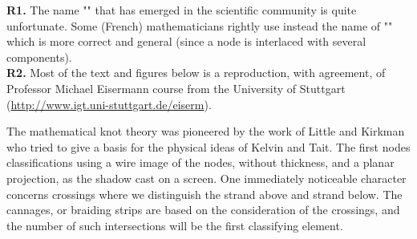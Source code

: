 {	\begin{tcolorbox}[title=Remarks,colframe=black,arc=10pt]
	\textbf{R1.} The name "" that has emerged in the scientific community is quite unfortunate. Some (French)  mathematicians rightly use instead the name of "" which is more correct and general (since a node is interlaced with several components).\\
	
	\textbf{R2.} Most of the text and figures below is a reproduction, with agreement, of Professor Michael Eisermann course from the University of Stuttgart (\url{http://www.igt.uni-stuttgart.de/eiserm}).
	\end{tcolorbox}	
	
		The mathematical knot theory was pioneered by the work of Little and Kirkman who tried to give a basis for the physical ideas of Kelvin and Tait. The first nodes classifications using a wire image of the nodes, without thickness, and a planar projection, as the shadow cast on a screen. One immediately noticeable character concerns crossings where we distinguish the strand above and strand below. The cannages, or braiding strips are based on the consideration of the crossings, and the number of such intersections will be the first classifying element.
		
}
